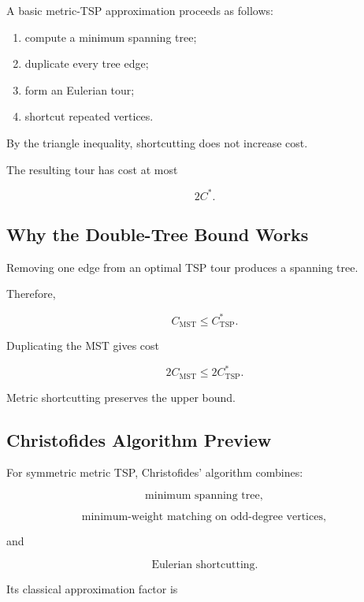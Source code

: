 A basic metric-TSP approximation proceeds as follows:

\begin{enumerate}
    \item compute a minimum spanning tree;
    \item duplicate every tree edge;
    \item form an Eulerian tour;
    \item shortcut repeated vertices.
\end{enumerate}

By the triangle inequality, shortcutting does not increase cost.

The resulting tour has cost at most

\[
\boxed{
2C^*.
}
\]

\subsection{Why the Double-Tree Bound Works}
\label{subsec:double-tree-bound}

Removing one edge from an optimal TSP tour produces a spanning tree.

Therefore,

\[
\boxed{
C_{\mathrm{MST}}
\leq
C^*_{\mathrm{TSP}}.
}
\]

Duplicating the MST gives cost

\[
2C_{\mathrm{MST}}
\leq
2C^*_{\mathrm{TSP}}.
\]

Metric shortcutting preserves the upper bound.

\subsection{Christofides Algorithm Preview}
\label{subsec:christofides-preview}

For symmetric metric TSP, Christofides' algorithm combines:

\[
\boxed{
\text{minimum spanning tree},
}
\]

\[
\boxed{
\text{minimum-weight matching on odd-degree vertices},
}
\]

and

\[
\boxed{
\text{Eulerian shortcutting}.
}
\]

Its classical approximation factor is

